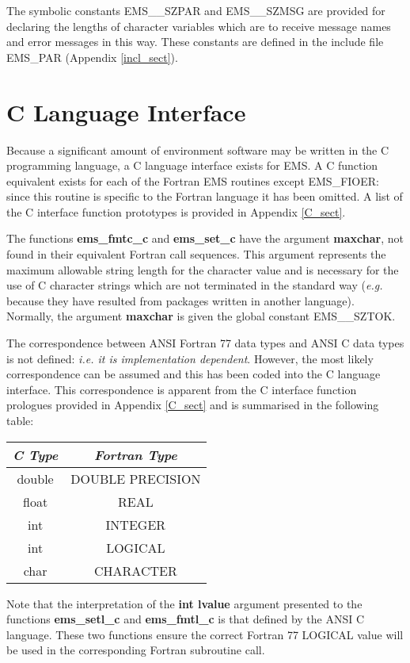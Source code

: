 The symbolic constants EMS\_\_SZPAR and EMS\_\_SZMSG are provided for declaring
the lengths of character variables which are to receive message names and 
error messages in this way.
These constants are defined in the include file EMS\_PAR 
(Appendix \ref{incl_sect}).


\section {C Language Interface}

Because a significant amount of environment software may be written in the C
programming language, a C language interface exists for EMS.
A C function equivalent exists for each of the Fortran EMS routines except
EMS\_FIOER: since this routine is specific to the Fortran language it has been
omitted.
A list of the C interface function prototypes is provided in Appendix
\ref{C_sect}.

The functions {\bf ems\_fmtc\_c} and {\bf ems\_set\_c} have the argument 
{\bf maxchar}, not found in their equivalent Fortran call sequences.
This argument represents the maximum allowable string length for the character
value and is necessary for the use of C character strings  which are not
terminated in the standard way ({\em e.g.} because they have resulted from
packages written in another language).
Normally, the argument {\bf maxchar} is given the global constant EMS\_\_SZTOK.

The correspondence between ANSI Fortran 77 data types and ANSI C data types
is not defined: {\em i.e. it is implementation dependent}.
However, the most likely correspondence can be assumed and this has been coded
into the C language interface.
This correspondence is apparent from the C interface function prologues
provided in Appendix \ref{C_sect} and is summarised in the following table:

\begin {center}
\begin {tabular}{||c|c||}
\hline
{\em C Type} & {\em Fortran Type}\\
\hline
double & DOUBLE PRECISION\\
float & REAL\\
int & INTEGER\\
int & LOGICAL\\
char & CHARACTER\\
\hline
\end {tabular}
\end {center}

Note that the interpretation of the {\bf int lvalue} argument presented to 
the functions {\bf ems\_setl\_c} and {\bf ems\_fmtl\_c} is that defined
by the ANSI C language.
These two functions ensure the correct Fortran 77 LOGICAL value  will be used
in the corresponding Fortran subroutine call.



